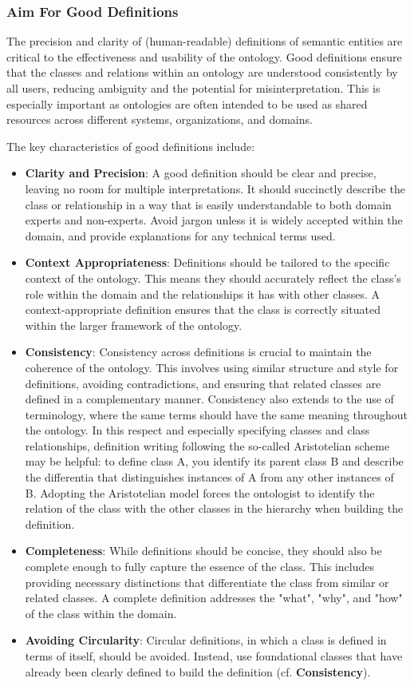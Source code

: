 \subsubsection{Aim For Good Definitions}

The precision and clarity of (human-readable) definitions of semantic entities are critical to the effectiveness and usability of the ontology. Good definitions ensure that the classes and relations within an ontology are understood consistently by all users, reducing ambiguity and the potential for misinterpretation. This is especially important as ontologies are often intended to be used as shared resources across different systems, organizations, and domains.

The key characteristics of good definitions include:
\begin{itemize}
    \item \textbf{Clarity and Precision}: A good definition should be clear and precise, leaving no room for multiple interpretations. It should succinctly describe the class or relationship in a way that is easily understandable to both domain experts and non-experts. Avoid jargon unless it is widely accepted within the domain, and provide explanations for any technical terms used.
    \item \textbf{Context Appropriateness}: Definitions should be tailored to the specific context of the ontology. This means they should accurately reflect the class's role within the domain and the relationships it has with other classes. A context-appropriate definition ensures that the class is correctly situated within the larger framework of the ontology.
    \item \textbf{Consistency}: Consistency across definitions is crucial to maintain the coherence of the ontology. This involves using similar structure and style for definitions, avoiding contradictions, and ensuring that related classes are defined in a complementary manner. Consistency also extends to the use of terminology, where the same terms should have the same meaning throughout the ontology. In this respect and especially specifying classes and class relationships, definition writing following the so-called Aristotelian scheme may be helpful: to define class A, you identify its parent class B and describe the differentia that distinguishes instances of A from any other instances of B. Adopting the Aristotelian model forces the ontologist to identify the relation of the class with the other classes in the hierarchy when building the definition.
    \item \textbf{Completeness}: While definitions should be concise, they should also be complete enough to fully capture the essence of the class. This includes providing necessary distinctions that differentiate the class from similar or related classes. A complete definition addresses the "what", "why", and "how" of the class within the domain.
    \item \textbf{Avoiding Circularity}: Circular definitions, in which a class is defined in terms of itself, should be avoided. Instead, use foundational classes that have already been clearly defined to build the definition (cf. \textbf{Consistency}).
\end{itemize}

